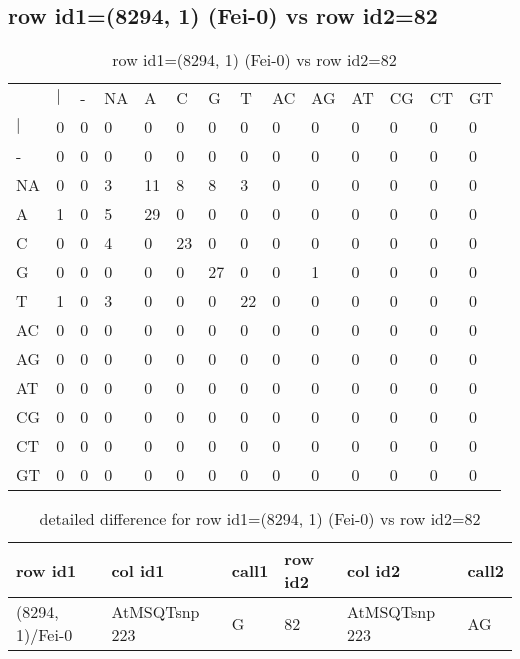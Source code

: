 \subsection{row id1=(8294, 1) (Fei-0) vs row id2=82}
\begin{center}
\begin{longtable}{|l|l|l|l|l|l|l|l|l|l|l|l|l|l|}
\caption{row id1=(8294, 1) (Fei-0) vs row id2=82} \label{table_dm466}\\
\hline
\\
\hline
&$|$&-&NA&A&C&G&T&AC&AG&AT&CG&CT&GT\\
$|$&0&0&0&0&0&0&0&0&0&0&0&0&0\\
-&0&0&0&0&0&0&0&0&0&0&0&0&0\\
NA&0&0&3&11&8&8&3&0&0&0&0&0&0\\
A&1&0&5&29&0&0&0&0&0&0&0&0&0\\
C&0&0&4&0&23&0&0&0&0&0&0&0&0\\
G&0&0&0&0&0&27&0&0&1&0&0&0&0\\
T&1&0&3&0&0&0&22&0&0&0&0&0&0\\
AC&0&0&0&0&0&0&0&0&0&0&0&0&0\\
AG&0&0&0&0&0&0&0&0&0&0&0&0&0\\
AT&0&0&0&0&0&0&0&0&0&0&0&0&0\\
CG&0&0&0&0&0&0&0&0&0&0&0&0&0\\
CT&0&0&0&0&0&0&0&0&0&0&0&0&0\\
GT&0&0&0&0&0&0&0&0&0&0&0&0&0\\
\hline
\end{longtable}
\end{center}

\begin{center}
\begin{longtable}{|l|l|l|l|l|l|}
\caption{detailed difference for row id1=(8294, 1) (Fei-0) vs row id2=82} \label{table_dm467}\\
\hline
row id1&col id1&call1&row id2&col id2&call2\\
\hline
(8294, 1)/Fei-0&AtMSQTsnp 223&G&82&AtMSQTsnp 223&AG\\
\hline
\end{longtable}
\end{center}

